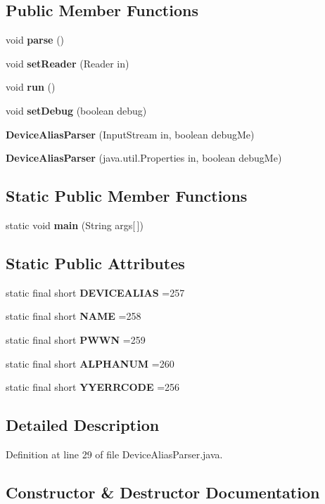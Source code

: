 \subsection*{Public Member Functions}
\begin{DoxyCompactItemize}
\item 
void {\bf parse} ()
\item 
void {\bf set\-Reader} (Reader in)
\item 
void {\bf run} ()
\item 
void {\bf set\-Debug} (boolean debug)
\item 
{\bf Device\-Alias\-Parser} (Input\-Stream in, boolean debug\-Me)
\item 
{\bf Device\-Alias\-Parser} (java.\-util.\-Properties in, boolean debug\-Me)
\end{DoxyCompactItemize}
\subsection*{Static Public Member Functions}
\begin{DoxyCompactItemize}
\item 
static void {\bf main} (String args[$\,$])
\end{DoxyCompactItemize}
\subsection*{Static Public Attributes}
\begin{DoxyCompactItemize}
\item 
static final short {\bf D\-E\-V\-I\-C\-E\-A\-L\-I\-A\-S} =257
\item 
static final short {\bf N\-A\-M\-E} =258
\item 
static final short {\bf P\-W\-W\-N} =259
\item 
static final short {\bf A\-L\-P\-H\-A\-N\-U\-M} =260
\item 
static final short {\bf Y\-Y\-E\-R\-R\-C\-O\-D\-E} =256
\end{DoxyCompactItemize}


\subsection{Detailed Description}


Definition at line 29 of file Device\-Alias\-Parser.\-java.



\subsection{Constructor \& Destructor Documentation}
